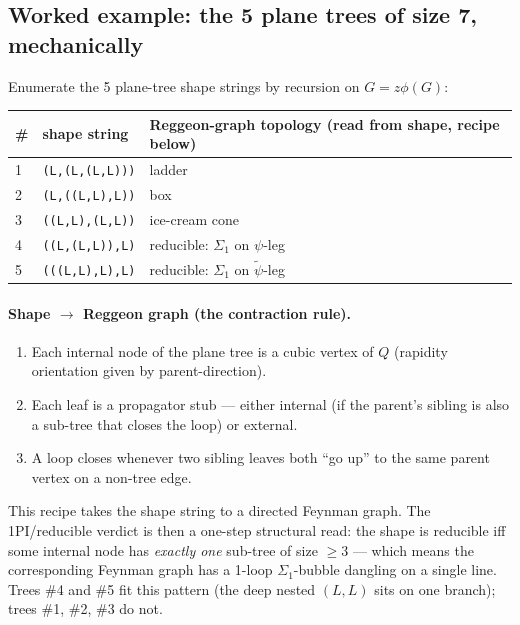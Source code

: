 \documentclass[11pt,a4paper]{article}
\begin{document}
\subsection{Worked example: the 5 plane trees of size 7, mechanically}

Enumerate the 5 plane-tree shape strings by recursion on $G=z\phi(G)$:

\begin{center}
\small
\begin{tabular}{@{}lll@{}}
\toprule
\# & shape string & Reggeon-graph topology (read from shape, recipe below) \\
\midrule
1 & \texttt{(L,(L,(L,L)))}    & ladder                                   \\
2 & \texttt{(L,((L,L),L))}    & box                                      \\
3 & \texttt{((L,L),(L,L))}    & ice-cream cone                           \\
4 & \texttt{((L,(L,L)),L)}    & reducible: $\Sigma_1$ on $\psi$-leg      \\
5 & \texttt{(((L,L),L),L)}    & reducible: $\Sigma_1$ on $\tilde\psi$-leg \\
\bottomrule
\end{tabular}
\end{center}

\paragraph{Shape $\to$ Reggeon graph (the contraction rule).}
\begin{enumerate}[leftmargin=2em,itemsep=1pt,topsep=2pt]
  \item Each internal node of the plane tree is a cubic vertex of $Q$
        (rapidity orientation given by parent-direction).
  \item Each leaf is a propagator stub --- either internal (if the parent's
        sibling is also a sub-tree that closes the loop) or external.
  \item A loop closes whenever two sibling leaves both ``go up'' to the same
        parent vertex on a non-tree edge.
\end{enumerate}
This recipe takes the shape string to a directed Feynman graph. The 1PI/reducible
verdict is then a one-step structural read: the shape is reducible iff some
internal node has \emph{exactly one} sub-tree of size $\ge 3$ --- which means
the corresponding Feynman graph has a 1-loop $\Sigma_1$-bubble dangling on a
single line. Trees \#4 and \#5 fit this pattern (the deep nested $(L,L)$ sits
on one branch); trees \#1, \#2, \#3 do not.
\end{document}
